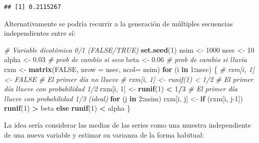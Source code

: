 \documentclass[
]{book}
\newenvironment{Shaded}{\begin{snugshade}}{\end{snugshade}}
\newcommand{\CommentTok}[1]{\textcolor[rgb]{0.56,0.35,0.01}{\textit{#1}}}
\newcommand{\ControlFlowTok}[1]{\textcolor[rgb]{0.13,0.29,0.53}{\textbf{#1}}}
\newcommand{\DataTypeTok}[1]{\textcolor[rgb]{0.13,0.29,0.53}{#1}}
\newcommand{\DecValTok}[1]{\textcolor[rgb]{0.00,0.00,0.81}{#1}}
\newcommand{\FloatTok}[1]{\textcolor[rgb]{0.00,0.00,0.81}{#1}}
\newcommand{\KeywordTok}[1]{\textcolor[rgb]{0.13,0.29,0.53}{\textbf{#1}}}
\newcommand{\NormalTok}[1]{#1}
\newcommand{\OperatorTok}[1]{\textcolor[rgb]{0.81,0.36,0.00}{\textbf{#1}}}
\newcommand{\OtherTok}[1]{\textcolor[rgb]{0.56,0.35,0.01}{#1}}
\newcommand{\StringTok}[1]{\textcolor[rgb]{0.31,0.60,0.02}{#1}}
\theoremstyle{break}
\theoremstyle{definition}
\theoremstyle{definition}
\theoremstyle{definition}
\theoremstyle{remark}
\begin{document}
\begin{verbatim}
## [1] 0.2115267
\end{verbatim}

Alternativamente se podría recurrir a la generación de múltiples secuencias
independientes entre sí:

\begin{Shaded}
\begin{Highlighting}[]
\CommentTok{# Variable dicotómica 0/1 (FALSE/TRUE)  }
\KeywordTok{set.seed}\NormalTok{(}\DecValTok{1}\NormalTok{)}
\NormalTok{nsim <-}\StringTok{ }\DecValTok{1000}
\NormalTok{nsec <-}\StringTok{ }\DecValTok{10}
\NormalTok{alpha <-}\StringTok{ }\FloatTok{0.03} \CommentTok{# prob de cambio si seco}
\NormalTok{beta <-}\StringTok{ }\FloatTok{0.06}  \CommentTok{# prob de cambio si lluvia}
\NormalTok{rxm <-}\StringTok{ }\KeywordTok{matrix}\NormalTok{(}\OtherTok{FALSE}\NormalTok{, }\DataTypeTok{nrow =}\NormalTok{ nsec, }\DataTypeTok{ncol=}\NormalTok{ nsim)}
\ControlFlowTok{for}\NormalTok{ (i }\ControlFlowTok{in} \DecValTok{1}\OperatorTok{:}\NormalTok{nsec) \{}
  \CommentTok{# rxm[i, 1] <- FALSE # El primer día no llueve}
  \CommentTok{# rxm[i, 1] <- runif(1) < 1/2 # El primer día llueve con probabilidad 1/2}
\NormalTok{  rxm[i, }\DecValTok{1}\NormalTok{] <-}\StringTok{ }\KeywordTok{runif}\NormalTok{(}\DecValTok{1}\NormalTok{) }\OperatorTok{<}\StringTok{ }\DecValTok{1}\OperatorTok{/}\DecValTok{3} \CommentTok{# El primer día llueve con probabilidad 1/3 (ideal)}
  \ControlFlowTok{for}\NormalTok{ (j }\ControlFlowTok{in} \DecValTok{2}\OperatorTok{:}\NormalTok{nsim)}
\NormalTok{    rxm[i, j] <-}\StringTok{ }\ControlFlowTok{if}\NormalTok{ (rxm[i, j}\DecValTok{-1}\NormalTok{]) }\KeywordTok{runif}\NormalTok{(}\DecValTok{1}\NormalTok{) }\OperatorTok{>}\StringTok{ }\NormalTok{beta }\ControlFlowTok{else} \KeywordTok{runif}\NormalTok{(}\DecValTok{1}\NormalTok{) }\OperatorTok{<}\StringTok{ }\NormalTok{alpha}
\NormalTok{\}}
\end{Highlighting}
\end{Shaded}

La idea sería considerar las medias de las series como una muestra independiente
de una nueva variable y estimar su varianza de la forma habitual:
\end{document}
